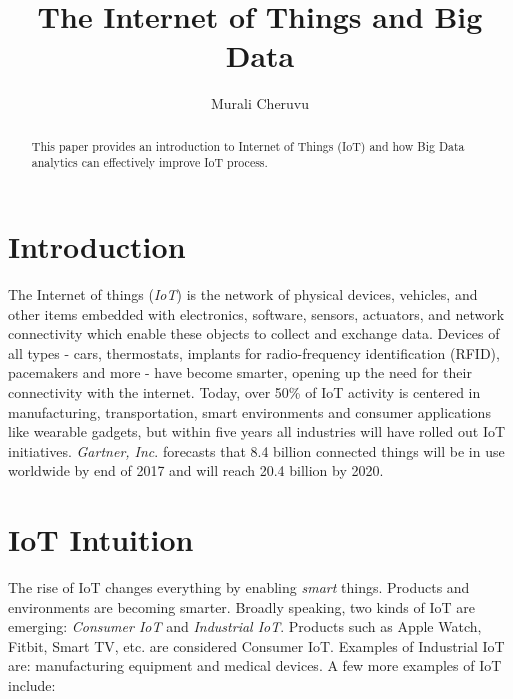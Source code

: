 \documentclass[sigconf]{acmart}
\begin{document}
\title{The Internet of Things and Big Data}


\author{Murali Cheruvu}

\renewcommand{\shortauthors}{M. Cheruvu}


\begin{abstract}
This paper provides an introduction to Internet of Things (IoT) and how Big Data analytics can effectively improve IoT process.
\end{abstract}



\maketitle

\section{Introduction}

The Internet of things ({\em IoT}) is the network of physical devices, vehicles, and other items embedded with electronics, software, sensors, actuators, and network connectivity which enable these objects to collect and exchange data\cite{1_wiki_iot}. Devices of all types - cars, thermostats, implants for radio-frequency identification (RFID), pacemakers and more - have become smarter, opening up the need for their connectivity with the internet. Today, over 50\% of IoT activity is centered in manufacturing, transportation, smart environments and consumer applications like wearable gadgets, but within five years all industries will have rolled out IoT initiatives. {\em Gartner, Inc}. forecasts that 8.4 billion connected things will be in use worldwide by end of 2017 and will reach 20.4 billion by 2020\cite{2_Gartner}. 

\section{IoT Intuition}

The rise of IoT changes everything by enabling {\em smart} things. Products and environments are becoming smarter. Broadly speaking, two kinds of IoT are emerging: {\em Consumer IoT} and {\em Industrial IoT}. Products such as Apple Watch, Fitbit, Smart TV, etc. are considered Consumer IoT. Examples of Industrial IoT are: manufacturing equipment and medical devices. A few more examples of IoT include:
\end{document}
